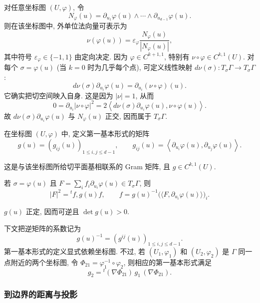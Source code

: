 对任意坐标图 $(U,\varphi)$, 令
\[
 N_\varphi(u)=\partial_{u_1}\varphi(u)\wedge\cdots\wedge
 \partial_{u_{d-1}}\varphi(u).
\]
则在该坐标图中, 外单位法向量可表示为
\[
 \nu(\varphi(u))=\varepsilon_\varphi\frac{N_\varphi(u)}{|N_\varphi(u)|},
\]
其中符号 $\varepsilon_\varphi\in\{-1,1\}$ 由定向决定. 因为 $\varphi\in C^{k+1,1}$, 特别有 $\nu\circ\varphi\in C^{k,1}(U)$. 对每个 $\sigma=\varphi(u)$ (当 $k=0$ 时为几乎每个点), 可定义线性映射 $d\nu(\sigma):T_\sigma\Gamma\to T_\sigma\Gamma$:
\[
 d\nu(\sigma)\partial_{u_i}\varphi(u)=\partial_{u_i}(\nu\circ\varphi)(u).
\]
它确实把切空间映入自身. 这是因为 $|\nu|=1$, 从而
\[
 0=\partial_{u_i}|\nu\circ\varphi|^2
 =2\left\langle d\nu(\sigma)\partial_{u_i}\varphi(u),
 \nu\circ\varphi(u)\right\rangle.
\]
故 $d\nu(\sigma)\partial_{u_i}\varphi(u)$ 与 $N_\varphi(u)$ 正交, 因而属于 $T_\sigma\Gamma$.

\begin{Definition}
\label{def:chap3-first-fundamental-form}
在坐标图 $(U,\varphi)$ 中, 定义第一基本形式的矩阵
\[
 g(u)=(g_{ij}(u))_{1\leq i,j\leq d-1},
 \qquad g_{ij}(u)=\left\langle\partial_{u_i}\varphi(u),\partial_{u_j}\varphi(u)\right\rangle.
\]
\end{Definition}

这是与该坐标图所给切平面基相联系的 Gram 矩阵, 且 $g\in C^{k,1}(U)$.

\begin{Proposition}
\label{prop:chap3-tangent-vector-metric}
若 $\sigma=\varphi(u)$ 且 $F=\sum_if_i\partial_{u_i}\varphi(u)\in T_\sigma\Gamma$, 则
\[
 |F|^2={}^tf,g(u)f,
 \qquad f=g(u)^{-1}\bigl(\langle F,\partial_{u_i}\varphi(u)\rangle\bigr)_i.
\]
\end{Proposition}

\begin{Corollary}
\label{cor:chap3-first-fundamental-positive}
$g(u)$ 正定, 因而可逆且 $\det g(u)>0$.
\end{Corollary}

下文把逆矩阵的系数记为
\[
 g(u)^{-1}=(g^{ij}(u))_{1\leq i,j\leq d-1}.
\]
第一基本形式的定义显式依赖坐标图. 不过, 若 $(U_1,\varphi_1)$ 和 $(U_2,\varphi_2)$ 是 $\Gamma$ 同一点附近的两个坐标图, 令 $\Phi_{21}=\varphi_1^{-1}\circ\varphi_2$, 则相应的第一基本形式满足
\[
 g_2={}^t(\nabla\Phi_{21})\,g_1\,(\nabla\Phi_{21}).
\]

\subsubsection{到边界的距离与投影}
\label{subsec:chap3-boundary-distance-projection}

